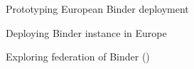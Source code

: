 \begin{task}[
  title=Prototype European Binder,
  id=eu-binder,
  lead=SRL,
  PM=25,
  wphases={0-48},
  partners={SRL,EGI,WTT,UPSUD}
]
  Prototyping European Binder deployment

  \begin{compactitem}
  \item Deploying Binder instance in Europe
  \item Exploring federation of Binder
    ()
  \end{compactitem}
\end{task}
